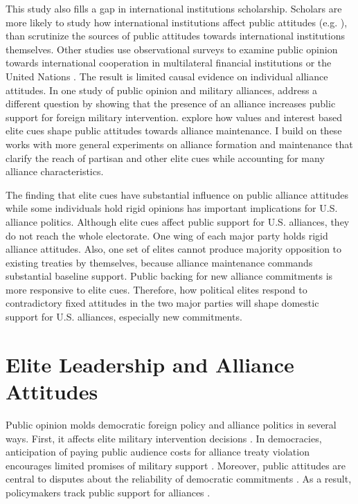 \documentclass[12pt]{article}
\begin{document}
This study also fills a gap in international institutions scholarship. 
Scholars are more likely to study how international institutions affect public attitudes (e.g. \citep{Griecoetal2011, KayaWalker2014, Greenhill2020}), than scrutinize the sources of public attitudes towards international institutions themselves. 
Other studies use observational surveys to examine public opinion towards international cooperation in multilateral financial institutions \citep{Edwards2009} or the United Nations \citep{Torgler2008, DellmuthTallberg2015}. 
The result is limited causal evidence on individual alliance attitudes.
In one study of public opinion and military alliances, \citet{TomzWeeks2021} address a different question by showing that the presence of an alliance increases public support for foreign military intervention. 
\citet{Chuetal2021} explore how values and interest based elite cues shape public attitudes towards alliance maintenance. 
I build on these works with more general experiments on alliance formation and maintenance that clarify the reach of partisan and other elite cues while accounting for many alliance characteristics. 


The finding that elite cues have substantial influence on public alliance attitudes while some individuals hold rigid opinions has important implications for U.S. alliance politics. 
Although elite cues affect public support for U.S. alliances, they do not reach the whole electorate.
One wing of each major party holds rigid alliance attitudes.
Also, one set of elites cannot produce majority opposition to existing treaties by themselves, because alliance maintenance commands substantial baseline support. 
Public backing for new alliance commitments is more responsive to elite cues. 
Therefore, how political elites respond to contradictory fixed attitudes in the two major parties will shape domestic support for U.S. alliances, especially new commitments.



\section{Elite Leadership and Alliance Attitudes}


Public opinion molds democratic foreign policy and alliance politics in several ways.
First, it affects elite military intervention decisions \citep{Tomzetal2020, LinGreenberg2021}. 
In democracies, anticipation of paying public audience costs for alliance treaty violation encourages limited promises of military support \citep{Chibaetal2015, FjelstulReiter2019}. 
Moreover, public attitudes are central to disputes about the reliability of democratic commitments \citep{Gaubatz1996, GartzkeGleditsch2004}. 
As a result, policymakers track public support for alliances \citep{Sayle2019}. 
\end{document}
